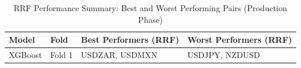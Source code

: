 \begin{table}[H] \centering \small
\caption{RRF Performance Summary: Best and Worst Performing Pairs (Production Phase)}
\label{tab:rrf_summary_production}
\begin{tabular}{l l p{5cm} p{5cm}}
\toprule
Model & Fold & Best Performers (RRF) & Worst Performers (RRF) \\
\midrule
XGBoost & Fold 1 & USDZAR, USDMXN & USDJPY, NZDUSD \\
\bottomrule
\end{tabular}
\end{table}
